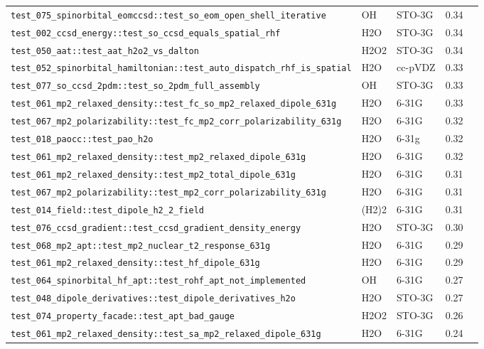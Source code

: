 \documentclass[10pt]{article}
\begin{document}
\begin{longtable}{l l l r c}
\texttt{test\_075\_spinorbital\_eomccsd::test\_so\_eom\_open\_shell\_iterative} & OH & STO-3G & 0.34 &  \\
\texttt{test\_002\_ccsd\_energy::test\_so\_ccsd\_equals\_spatial\_rhf} & H2O & STO-3G & 0.34 &  \\
\texttt{test\_050\_aat::test\_aat\_h2o2\_vs\_dalton} & H2O2 & STO-3G & 0.34 &  \\
\texttt{test\_052\_spinorbital\_hamiltonian::test\_auto\_dispatch\_rhf\_is\_spatial} & H2O & cc-pVDZ & 0.33 &  \\
\texttt{test\_077\_so\_ccsd\_2pdm::test\_so\_2pdm\_full\_assembly} & OH & STO-3G & 0.33 &  \\
\texttt{test\_061\_mp2\_relaxed\_density::test\_fc\_so\_mp2\_relaxed\_dipole\_631g} & H2O & 6-31G & 0.33 &  \\
\texttt{test\_067\_mp2\_polarizability::test\_fc\_mp2\_corr\_polarizability\_631g} & H2O & 6-31G & 0.32 &  \\
\texttt{test\_018\_paocc::test\_pao\_h2o} & H2O & 6-31g & 0.32 &  \\
\texttt{test\_061\_mp2\_relaxed\_density::test\_mp2\_relaxed\_dipole\_631g} & H2O & 6-31G & 0.32 &  \\
\texttt{test\_061\_mp2\_relaxed\_density::test\_mp2\_total\_dipole\_631g} & H2O & 6-31G & 0.31 &  \\
\texttt{test\_067\_mp2\_polarizability::test\_mp2\_corr\_polarizability\_631g} & H2O & 6-31G & 0.31 &  \\
\texttt{test\_014\_field::test\_dipole\_h2\_2\_field} & (H2)2 & 6-31G & 0.31 &  \\
\texttt{test\_076\_ccsd\_gradient::test\_ccsd\_gradient\_density\_energy} & H2O & STO-3G & 0.30 &  \\
\texttt{test\_068\_mp2\_apt::test\_mp2\_nuclear\_t2\_response\_631g} & H2O & 6-31G & 0.29 &  \\
\texttt{test\_061\_mp2\_relaxed\_density::test\_hf\_dipole\_631g} & H2O & 6-31G & 0.29 &  \\
\texttt{test\_064\_spinorbital\_hf\_apt::test\_rohf\_apt\_not\_implemented} & OH & 6-31G & 0.27 &  \\
\texttt{test\_048\_dipole\_derivatives::test\_dipole\_derivatives\_h2o} & H2O & STO-3G & 0.27 &  \\
\texttt{test\_074\_property\_facade::test\_apt\_bad\_gauge} & H2O2 & STO-3G & 0.26 &  \\
\texttt{test\_061\_mp2\_relaxed\_density::test\_sa\_mp2\_relaxed\_dipole\_631g} & H2O & 6-31G & 0.24 &  \\

\end{longtable}
\end{document}
